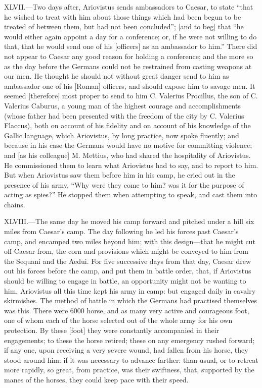 XLVII.—Two days after, Ariovistus sends ambassadors to Caesar, to state
``that he wished to treat with him about those things which had been
begun to be treated of between them, but had not been concluded''; [and
to beg] that ``he would either again appoint a day for a conference; or,
if he were not willing to do that, that he would send one of his
[officers] as an ambassador to him.'' There did not appear to Caesar any
good reason for holding a conference; and the more so as the day before
the Germans could not be restrained from casting weapons at our men. He
thought he should not without great danger send to him as ambassador one
of his [Roman] officers, and should expose him to savage men. It seemed
[therefore] most proper to send to him C. Valerius Procillus, the son of
C. Valerius Caburus, a young man of the highest courage and
accomplishments (whose father had been presented with the freedom of the
city by C. Valerius Flaccus), both on account of his fidelity and on
account of his knowledge of the Gallic language, which Ariovistus, by
long practice, now spoke fluently; and because in his case the Germans
would have no motive for committing violence; and [as his colleague] M.
Mettius, who had shared the hospitality of Ariovistus. He commissioned
them to learn what Ariovistus had to say, and to report to him. But when
Ariovistus saw them before him in his camp, he cried out in the presence
of his army, ``Why were they come to him? was it for the purpose of
acting as spies?'' He stopped them when attempting to speak, and cast
them into chains.

XLVIII.—The same day he moved his camp forward and pitched under a hill
six miles from Caesar's camp. The day following he led his forces past
Caesar's camp, and encamped two miles beyond him; with this design—that
he might cut off Caesar from, the corn and provisions which might be
conveyed to him from the Sequani and the Aedui. For five successive days
from that day, Caesar drew out his forces before the camp, and put them
in battle order, that, if Ariovistus should be willing to engage in
battle, an opportunity might not be wanting to him. Ariovistus all this
time kept his army in camp: but engaged daily in cavalry skirmishes. The
method of battle in which the Germans had practised themselves was this.
There were 6000 horse, and as many very active and courageous foot, one
of whom each of the horse selected out of the whole army for his own
protection. By these [foot] they were constantly accompanied in their
engagements; to these the horse retired; these on any emergency rushed
forward; if any one, upon receiving a very severe wound, had fallen from
his horse, they stood around him: if it was necessary to advance
farther: than usual, or to retreat more rapidly, so great, from
practice, was their swiftness, that, supported by the manes of the
horses, they could keep pace with their speed.

